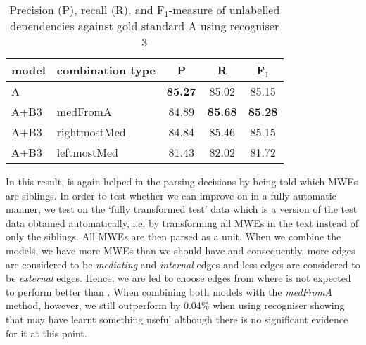 \documentclass[output=paper]{LSP/langsci}
\begin{document}
\begin{table}[H]
    \footnotesize
    \def\arraystretch{1.20} 
    \centering
    \begin{tabular}{| l | l | c | c | c |} \hline
        \textbf{model}
        & \textbf{combination type}
        & \textbf{P}
        & \textbf{R}
        & \textbf{F$_1$}
        \\ \hline
        A & & \textbf{85.27} & 85.02 & 85.15\\
        A+B3 & medFromA &84.89  &\textbf{85.68} & \textbf{85.28} \\
        A+B3 & rightmostMed &84.84  &85.46  & 85.15 \\
        A+B3 & leftmostMed &81.43  &82.02  & 81.72 \\
        \hline
    \end{tabular}
    \caption{Precision (P), recall (R), and F$_1$-measure of unlabelled dependencies against gold standard A using recogniser 3\label{tab:res2}}
\end{table}

\indent In this result, \modelB is again helped in the parsing decisions by being told which MWEs are siblings. In order to test whether we can improve on \modelA in a fully automatic manner, we test \modelB on the `fully transformed test' data which is a version of the test data obtained automatically, i.e. by transforming all MWEs in the text instead of only the siblings. All MWEs are then parsed as a unit. When we combine the models, we have more MWEs than we should have and consequently, more edges are considered to be \textit{mediating} and \textit{internal} edges and less edges are considered to be \textit{external} edges. Hence, we are led to choose edges from \modelA where \modelA is not expected to perform better than \modelB. When combining both models with the \textit{medFromA} method, however, we still outperform \modelA by 0.04\% when using recogniser showing that \modelB may have learnt something useful although there is no significant evidence for it at this point. 
\end{document}
